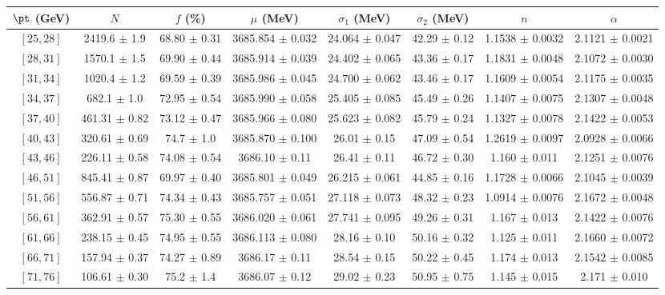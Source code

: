 \begin{tabular}{c||c|c|c|c|c|c|c}
$\pt$ (GeV) & $N$ & $f$ (\%) & $\mu$ (MeV) & $\sigma_1$ (MeV) & $\sigma_2$ (MeV) & $n$ & $\alpha$ \\
\hline
$[25, 28]$ & 2419.6 $\pm$ 1.9 & 68.80 $\pm$ 0.31 & 3685.854 $\pm$ 0.032 & 24.064 $\pm$ 0.047 & 42.29 $\pm$ 0.12 & 1.1538 $\pm$ 0.0032 & 2.1121 $\pm$ 0.0021\\
$[28, 31]$ & 1570.1 $\pm$ 1.5 & 69.90 $\pm$ 0.44 & 3685.914 $\pm$ 0.039 & 24.402 $\pm$ 0.065 & 43.36 $\pm$ 0.17 & 1.1831 $\pm$ 0.0048 & 2.1072 $\pm$ 0.0030\\
$[31, 34]$ & 1020.4 $\pm$ 1.2 & 69.59 $\pm$ 0.39 & 3685.986 $\pm$ 0.045 & 24.700 $\pm$ 0.062 & 43.46 $\pm$ 0.17 & 1.1609 $\pm$ 0.0054 & 2.1175 $\pm$ 0.0035\\
$[34, 37]$ & 682.1 $\pm$ 1.0 & 72.95 $\pm$ 0.54 & 3685.990 $\pm$ 0.058 & 25.405 $\pm$ 0.085 & 45.49 $\pm$ 0.26 & 1.1407 $\pm$ 0.0075 & 2.1307 $\pm$ 0.0048\\
$[37, 40]$ & 461.31 $\pm$ 0.82 & 73.12 $\pm$ 0.47 & 3685.966 $\pm$ 0.080 & 25.623 $\pm$ 0.082 & 45.79 $\pm$ 0.24 & 1.1327 $\pm$ 0.0078 & 2.1422 $\pm$ 0.0053\\
$[40, 43]$ & 320.61 $\pm$ 0.69 & 74.7 $\pm$ 1.0 & 3685.870 $\pm$ 0.100 & 26.01 $\pm$ 0.15 & 47.09 $\pm$ 0.54 & 1.2619 $\pm$ 0.0097 & 2.0928 $\pm$ 0.0066\\
$[43, 46]$ & 226.11 $\pm$ 0.58 & 74.08 $\pm$ 0.54 & 3686.10 $\pm$ 0.11 & 26.41 $\pm$ 0.11 & 46.72 $\pm$ 0.30 & 1.160 $\pm$ 0.011 & 2.1251 $\pm$ 0.0076\\
$[46, 51]$ & 845.41 $\pm$ 0.87 & 69.97 $\pm$ 0.40 & 3685.801 $\pm$ 0.049 & 26.215 $\pm$ 0.061 & 44.85 $\pm$ 0.16 & 1.1728 $\pm$ 0.0066 & 2.1045 $\pm$ 0.0039\\
$[51, 56]$ & 556.87 $\pm$ 0.71 & 74.34 $\pm$ 0.43 & 3685.757 $\pm$ 0.051 & 27.118 $\pm$ 0.073 & 48.32 $\pm$ 0.23 & 1.0914 $\pm$ 0.0076 & 2.1672 $\pm$ 0.0048\\
$[56, 61]$ & 362.91 $\pm$ 0.57 & 75.30 $\pm$ 0.55 & 3686.020 $\pm$ 0.061 & 27.741 $\pm$ 0.095 & 49.26 $\pm$ 0.31 & 1.167 $\pm$ 0.013 & 2.1422 $\pm$ 0.0076\\
$[61, 66]$ & 238.15 $\pm$ 0.45 & 74.95 $\pm$ 0.55 & 3686.113 $\pm$ 0.080 & 28.16 $\pm$ 0.10 & 50.16 $\pm$ 0.32 & 1.125 $\pm$ 0.011 & 2.1660 $\pm$ 0.0072\\
$[66, 71]$ & 157.94 $\pm$ 0.37 & 74.27 $\pm$ 0.89 & 3686.17 $\pm$ 0.11 & 28.54 $\pm$ 0.15 & 50.22 $\pm$ 0.45 & 1.174 $\pm$ 0.013 & 2.1542 $\pm$ 0.0085\\
$[71, 76]$ & 106.61 $\pm$ 0.30 & 75.2 $\pm$ 1.4 & 3686.07 $\pm$ 0.12 & 29.02 $\pm$ 0.23 & 50.95 $\pm$ 0.75 & 1.145 $\pm$ 0.015 & 2.171 $\pm$ 0.010\\

\end{tabular}
